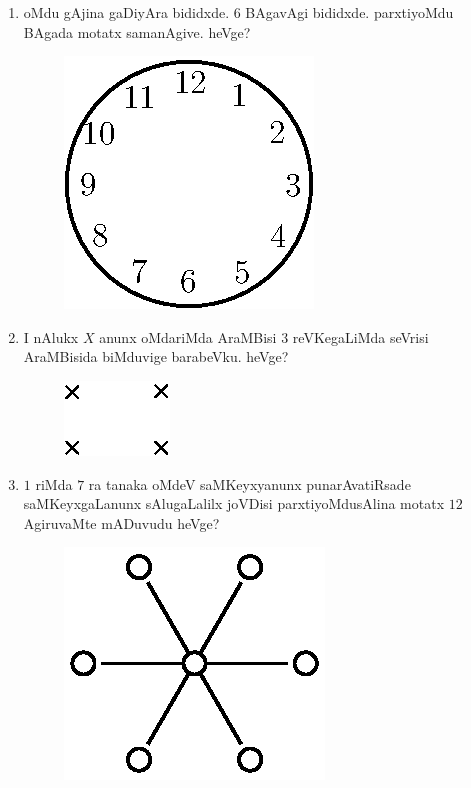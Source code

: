 \begin{enumerate}
\item oMdu gAjina gaDiyAra bididxde. $6$ BAgavAgi bididxde. parxtiyoMdu BAgada motatx samanAgive. heVge?
\begin{figure}[H]
\centering
\includegraphics{src/figures/exr31.eps}
\end{figure}

\item I nAlukx $X$ anunx oMdariMda AraMBisi $3$ reVKegaLiMda seVrisi AraMBisida biMduvige barabeVku. heVge?
\begin{figure}[H]
\centering
\includegraphics{src/figures/exr32.eps}
\end{figure}


\item $1$ riMda $7$ ra tanaka oMdeV saMKeyxyanunx punarAvatiRsade saMKeyxgaLanunx sAlugaLalilx joVDisi parxtiyoMdusAlina motatx $12$ AgiruvaMte mADuvudu heVge?
\begin{figure}[H]
\centering
\includegraphics{src/figures/exr33.eps}
\end{figure}


\end{enumerate}
